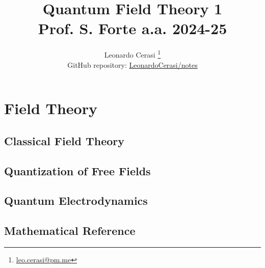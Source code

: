 \documentclass[a4paper, 12pt, openany]{book}
\title{\Huge\textbf{Quantum Field Theory 1} \\ \large Prof. S. Forte a.a. 2024-25}
\author{Leonardo Cerasi%
	\thanks{\scriptsize\href{mailto:leonardo.cerasi@studenti.unimi.it}{leo.cerasi@pm.me}}\\
	\small GitHub repository: \href{https://github.com/LeonardoCerasi/notes}{LeonardoCerasi/notes}}
\begin{document}
\frontmatter

\maketitle
\tableofcontents
\pagestyle{contents}

\mainmatter

\part{Field Theory}
\pagestyle{body}

\chapter{Classical Field Theory}


\chapter{Quantization of Free Fields}


\chapter{Quantum Electrodynamics}


\begin{appendices}
\pagestyle{append}

\chapter{Mathematical Reference}


\clearpage
\end{appendices}
\end{document}
